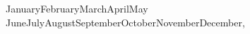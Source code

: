 \begin{center}
\vfill{}
\par\end{center}

\begin{center}
\renewcommand{\today}{\ifcase \month \or January\or February\or March\or   April\or May \or June\or July\or August\or September\or October\or November\or  December\fi, \number \year} 

\begin{center}
\large{\today}
\end{center}
\end{center}

\pagebreak{}
